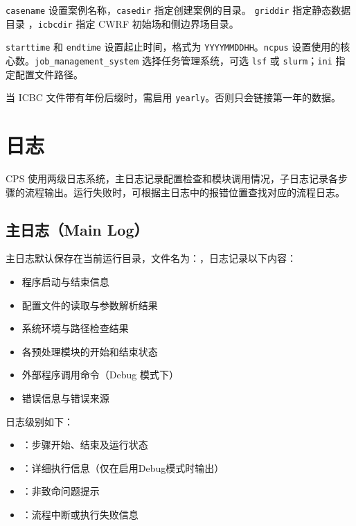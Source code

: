 \documentclass[UTF8,a4paper,11pt,fontset=none]{ctexart}
\begin{document}
\texttt{casename} 设置案例名称，\texttt{casedir} 指定创建案例的目录。
\texttt{griddir} 指定静态数据目录 ，\texttt{icbcdir} 指定 CWRF 初始场和侧边界场目录。

\texttt{starttime} 和 \texttt{endtime} 设置起止时间，格式为 \texttt{YYYYMMDDHH}。\texttt{ncpus} 设置使用的核心数。\texttt{job\_management\_system} 选择任务管理系统，可选 \texttt{lsf} 或 \texttt{slurm}；\texttt{ini} 指定配置文件路径。

当 ICBC 文件带有年份后缀时，需启用 \texttt{yearly}。否则只会链接第一年的数据。




\newpage

\section{日志}

CPS 使用两级日志系统，主日志记录配置检查和模块调用情况，子日志记录各步骤的流程输出。运行失败时，可根据主日志中的报错位置查找对应的流程日志。

\subsection{主日志（Main Log）}

主日志默认保存在当前运行目录，文件名为：，日志记录以下内容：

\begin{itemize}[leftmargin=4em]
    \item 程序启动与结束信息
    \item 配置文件的读取与参数解析结果
    \item 系统环境与路径检查结果
    \item 各预处理模块的开始和结束状态
    \item 外部程序调用命令（Debug 模式下）
    \item 错误信息与错误来源
\end{itemize}

日志级别如下：

\begin{itemize}[leftmargin=4em]
    \item {}：步骤开始、结束及运行状态
    \item {}：详细执行信息（仅在启用Debug模式时输出）
    \item {}：非致命问题提示
    \item {}：流程中断或执行失败信息
\end{itemize}
\end{document}
